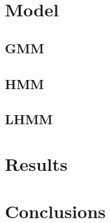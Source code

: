 \documentclass[10pt,twocolumn,letterpaper]{article}
\begin{document}
\section{Model}


\subsection{GMM}



\subsection{HMM}


\subsection{LHMM}


\section{Results}


\section{Conclusions}

{\small


}
\end{document}
